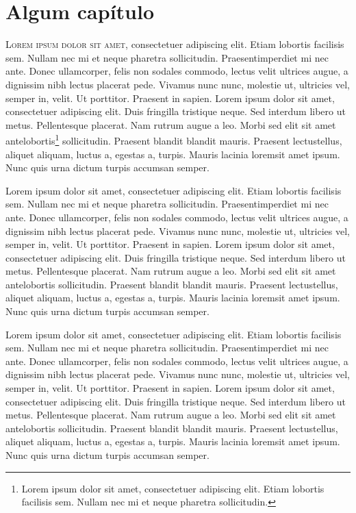 \chapter{Algum capítulo}

\lettrine{L}{orem ipsum dolor sit amet}, consectetuer adipiscing elit. Etiam lobortis facilisis sem. Nullam nec mi et neque pharetra sollicitudin. Praesentimperdiet mi nec ante. Donec ullamcorper, felis non sodales commodo, lectus velit ultrices augue, a dignissim nibh lectus placerat pede. Vivamus nunc nunc, molestie ut, ultricies vel, semper in, velit. Ut porttitor. Praesent in sapien. Lorem ipsum dolor sit amet, consectetuer adipiscing elit. Duis fringilla tristique neque. Sed interdum libero ut metus. Pellentesque placerat. Nam rutrum augue a leo. Morbi sed elit sit amet antelobortis\footnote{Lorem ipsum dolor sit amet, consectetuer adipiscing elit. Etiam lobortis facilisis sem. Nullam nec mi et neque pharetra sollicitudin.} sollicitudin. Praesent blandit blandit mauris. Praesent lectustellus, aliquet aliquam, luctus a, egestas a, turpis. Mauris lacinia loremsit amet ipsum. Nunc quis urna dictum turpis accumsan semper.

Lorem ipsum dolor sit amet, consectetuer adipiscing elit. Etiam lobortis facilisis sem. Nullam nec mi et neque pharetra sollicitudin. Praesentimperdiet mi nec ante. Donec ullamcorper, felis non sodales commodo, lectus velit ultrices augue, a dignissim nibh lectus placerat pede. Vivamus nunc nunc, molestie ut, ultricies vel, semper in, velit. Ut porttitor. Praesent in sapien. Lorem ipsum dolor sit amet, consectetuer adipiscing elit. Duis fringilla tristique neque. Sed interdum libero ut metus. Pellentesque placerat. Nam rutrum augue a leo. Morbi sed elit sit amet antelobortis sollicitudin. Praesent blandit blandit mauris. Praesent lectustellus, aliquet aliquam, luctus a, egestas a, turpis. Mauris lacinia loremsit amet ipsum. Nunc quis urna dictum turpis accumsan semper.

Lorem ipsum dolor sit amet, consectetuer adipiscing elit. Etiam lobortis facilisis sem. Nullam nec mi et neque pharetra sollicitudin. Praesentimperdiet mi nec ante. Donec ullamcorper, felis non sodales commodo, lectus velit ultrices augue, a dignissim nibh lectus placerat pede. Vivamus nunc nunc, molestie ut, ultricies vel, semper in, velit. Ut porttitor. Praesent in sapien. Lorem ipsum dolor sit amet, consectetuer adipiscing elit. Duis fringilla tristique neque. Sed interdum libero ut metus. Pellentesque placerat. Nam rutrum augue a leo. Morbi sed elit sit amet antelobortis sollicitudin. Praesent blandit blandit mauris. Praesent lectustellus, aliquet aliquam, luctus a, egestas a, turpis. Mauris lacinia loremsit amet ipsum. Nunc quis urna dictum turpis accumsan semper.

